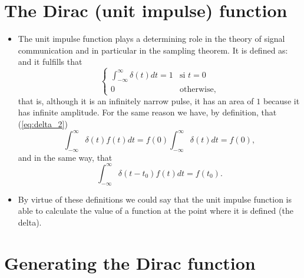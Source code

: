 \section{The Dirac (unit impulse) function}
\begin{itemize}
\item The unit impulse function \cite{Lathi} plays a determining role
  in the theory of signal communication and in particular in the
  sampling theorem. It is defined as:
  and it fulfills that
  \begin{equation}
    \left\{
      \begin{array}{ll}
        \displaystyle\int_{-\infty}^\infty\delta(t)dt=1 & \text{si $t=0$}\\
        0 & \text{otherwise,}
      \end{array}
    \right.
    \tag{delta\_1}
    \label{eq:delta_1}
  \end{equation}
  that is, although it is an infinitely narrow pulse, it has an area
  of $1$ because it has infinite amplitude. For the same reason we have,
  by definition, that (\ref{eq:delta_2})
  \begin{equation}
    \int_{-\infty}^\infty\delta(t)f(t)dt =
    f(0)\int_{-\infty}^\infty\delta(t)dt = f(0),
    \tag{delta\_2}
    \label{eq:delta_2}
  \end{equation}
  and in the same way, that
  \begin{equation}
    \int_{-\infty}^\infty\delta(t-t_0)f(t)dt = f(t_0).
    \tag{delta\_3}
    \label{eq:delta_3}
  \end{equation}
\item By virtue of these definitions we could say that the unit
  impulse function is able to calculate the value of a function at the
  point where it is defined (the delta).
\end{itemize}

\section{Generating the Dirac function}


